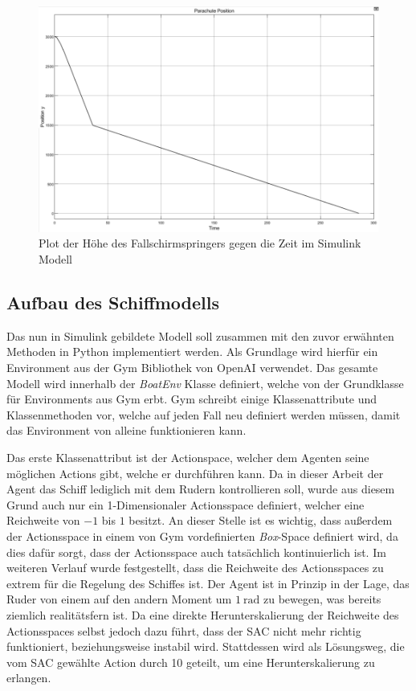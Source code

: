 \documentclass[]{iat}
\begin{document}
\begin{figure}[H]
    \includegraphics[width=\textwidth]{graphics/simulink_parachute_s_plot.png}
    \centering
    \caption{Plot der Höhe des Fallschirmspringers gegen die Zeit im Simulink Modell}
    \label{abb:simulink_parachute_s_plot}
\end{figure}

\subsection{Aufbau des Schiffmodells} \label{sec:aufbau_schiffsmodell}
Das nun in Simulink gebildete Modell soll zusammen mit den zuvor erwähnten Methoden in Python implementiert werden. Als Grundlage wird hierfür ein Environment aus der Gym Bibliothek von OpenAI verwendet. Das gesamte Modell wird innerhalb der \textit{BoatEnv} Klasse definiert, welche von der Grundklasse für Environments aus Gym erbt. Gym schreibt einige Klassenattribute und Klassenmethoden vor, welche auf jeden Fall neu definiert werden müssen, damit das Environment von alleine funktionieren kann.

Das erste Klassenattribut ist der Actionspace, welcher dem Agenten seine möglichen Actions gibt, welche er durchführen kann. Da in dieser Arbeit der Agent das Schiff lediglich mit dem Rudern kontrollieren soll, wurde aus diesem Grund auch nur ein 1-Dimensionaler Actionsspace definiert, welcher eine Reichweite von $-1$ bis $1$ besitzt. An dieser Stelle ist es wichtig, dass außerdem der Actionsspace in einem von Gym vordefinierten \textit{Box}-Space definiert wird, da dies dafür sorgt, dass der Actionsspace auch tatsächlich kontinuierlich ist. Im weiteren Verlauf wurde festgestellt, dass die Reichweite des Actionsspaces zu extrem für die Regelung des Schiffes ist. Der Agent ist in Prinzip in der Lage, das Ruder von einem auf den andern Moment um $\SI{1}{\radian}$ zu bewegen, was bereits ziemlich realitätsfern ist. Da eine direkte Herunterskalierung der Reichweite des Actionsspaces selbst jedoch dazu führt, dass der SAC nicht mehr richtig funktioniert, beziehungsweise instabil wird. Stattdessen wird als Lösungsweg, die vom SAC gewählte Action durch 10 geteilt, um eine Herunterskalierung zu erlangen.
\end{document}
